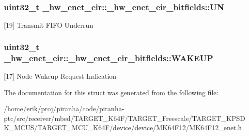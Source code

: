 \subsubsection[{\texorpdfstring{UN}{UN}}]{\setlength{\rightskip}{0pt plus 5cm}uint32\+\_\+t \+\_\+hw\+\_\+enet\+\_\+eir\+::\+\_\+hw\+\_\+enet\+\_\+eir\+\_\+bitfields\+::\+UN}\hypertarget{struct__hw__enet__eir_1_1__hw__enet__eir__bitfields_a2e7e34896d53bd8d164a6c4515780c1f}{}\label{struct__hw__enet__eir_1_1__hw__enet__eir__bitfields_a2e7e34896d53bd8d164a6c4515780c1f}
\mbox{[}19\mbox{]} Transmit F\+I\+FO Underrun 
\subsubsection[{\texorpdfstring{W\+A\+K\+E\+UP}{WAKEUP}}]{\setlength{\rightskip}{0pt plus 5cm}uint32\+\_\+t \+\_\+hw\+\_\+enet\+\_\+eir\+::\+\_\+hw\+\_\+enet\+\_\+eir\+\_\+bitfields\+::\+W\+A\+K\+E\+UP}\hypertarget{struct__hw__enet__eir_1_1__hw__enet__eir__bitfields_a694d7d32077d2079560c5e98c108e5c0}{}\label{struct__hw__enet__eir_1_1__hw__enet__eir__bitfields_a694d7d32077d2079560c5e98c108e5c0}
\mbox{[}17\mbox{]} Node Wakeup Request Indication 

The documentation for this struct was generated from the following file\+:\begin{DoxyCompactItemize}
\item 
/home/erik/proj/piranha/code/piranha-\/ptc/src/receiver/mbed/\+T\+A\+R\+G\+E\+T\+\_\+\+K64\+F/\+T\+A\+R\+G\+E\+T\+\_\+\+Freescale/\+T\+A\+R\+G\+E\+T\+\_\+\+K\+P\+S\+D\+K\+\_\+\+M\+C\+U\+S/\+T\+A\+R\+G\+E\+T\+\_\+\+M\+C\+U\+\_\+\+K64\+F/device/device/\+M\+K64\+F12/M\+K64\+F12\+\_\+enet.\+h\end{DoxyCompactItemize}
